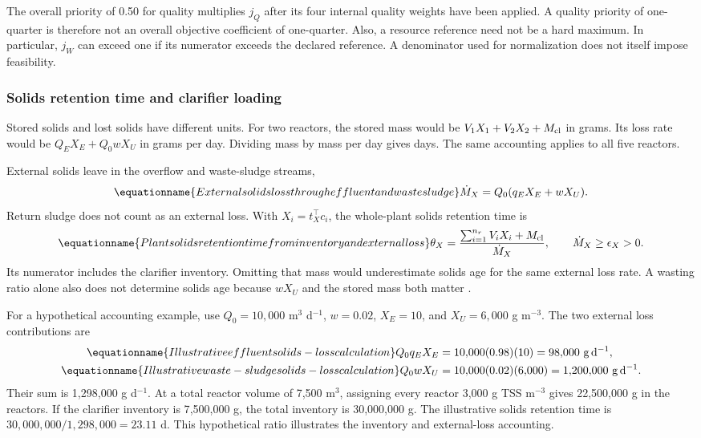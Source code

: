 The overall priority of 0.50 for quality multiplies $j_Q$ after its four internal quality weights have been applied. A quality priority of one-quarter is therefore not an overall objective coefficient of one-quarter. Also, a resource reference need not be a hard maximum. In particular, $j_W$ can exceed one if its numerator exceeds the declared reference. A denominator used for normalization does not itself impose feasibility.

\subsubsection{Solids retention time and clarifier loading}

Stored solids and lost solids have different units. For two reactors, the stored mass would be $V_1X_1+V_2X_2+M_{\rm cl}$ in grams. Its loss rate would be $Q_EX_E+Q_0wX_U$ in grams per day. Dividing mass by mass per day gives days. The same accounting applies to all five reactors.

External solids leave in the overflow and waste-sludge streams,
\begin{equation}
\equationname{External solids loss through effluent and waste sludge}
\dot M_X=Q_0(q_EX_E+wX_U).
\label{eq:plant_external_solids_loss}
\end{equation}
Return sludge does not count as an external loss. With $X_i=t_X^\top c_i$, the whole-plant solids retention time is
\begin{equation}
\equationname{Plant solids retention time from inventory and external loss}
\theta_X=\frac{\sum_{i=1}^{n_r}V_iX_i+M_{\rm cl}}{\dot M_X},
\qquad\dot M_X\ge\epsilon_X>0.
\label{eq:plant_solids_age}
\end{equation}
Its numerator includes the clarifier inventory. Omitting that mass would underestimate solids age for the same external loss rate. A wasting ratio alone also does not determine solids age because $wX_U$ and the stored mass both matter \citep{Alex2008}.

For a hypothetical accounting example, use $Q_0=10{,}000$ m$^3$ d$^{-1}$, $w=0.02$, $X_E=10$, and $X_U=6{,}000$ g m$^{-3}$. The two external loss contributions are
\begin{align}
\equationname{Illustrative effluent solids-loss calculation}
Q_0q_EX_E&=10{,}000(0.98)(10)=98{,}000\ \mathrm{g\,d^{-1}},\\
\equationname{Illustrative waste-sludge solids-loss calculation}
Q_0wX_U&=10{,}000(0.02)(6{,}000)=1{,}200{,}000\ \mathrm{g\,d^{-1}}.
\end{align}
Their sum is 1{,}298{,}000 g d$^{-1}$. At a total reactor volume of 7{,}500 m$^3$, assigning every reactor 3{,}000 g TSS m$^{-3}$ gives 22{,}500{,}000 g in the reactors. If the clarifier inventory is 7{,}500{,}000 g, the total inventory is 30{,}000{,}000 g. The illustrative solids retention time is $30{,}000{,}000/1{,}298{,}000=23.11$ d. This hypothetical ratio illustrates the inventory and external-loss accounting.

